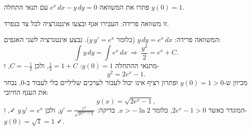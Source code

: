 
\begin{question}
פתרו את המשוואה $e^x\,dx-y\,dy=0$ עם תנאי התחלה $y(0)=1$.
\end{question}

\begin{hint}
זו משוואה פרידה: העבירו אגף ובצעו אינטגרציה לכל צד בנפרד.
\end{hint}

\begin{solution}
המשוואה פרידה: $y\,dy=e^x\,dx$ (כלומר $y\,y'=e^x$). נבצע אינטגרציה לשני האגפים:
\[ \int y\,dy=\int e^x\,dx\ \Longrightarrow\ \frac{y^2}{2}=e^x+C. \]
מתנאי ההתחלה $y(0)=1$: $\frac12=1+C$, ולכן $C=-\frac12$, ו-
\[ y^2=2e^x-1. \]
מכיוון ש-$y(0)=1>0$ ופתרון רציף אינו יכול לעבור לערכים שליליים בלי לעבור ב-$0$, נבחר את הענף החיובי:
\[ y(x)=\sqrt{2e^x-1}, \]
המוגדר כאשר $2e^x-1>0$, כלומר $x>-\ln 2$.
בדיקה: $y'=\frac{e^x}{\sqrt{2e^x-1}}$, ולכן $y\,y'=e^x$ ✓, ו-$y(0)=\sqrt{1}=1$ ✓.
\end{solution}
